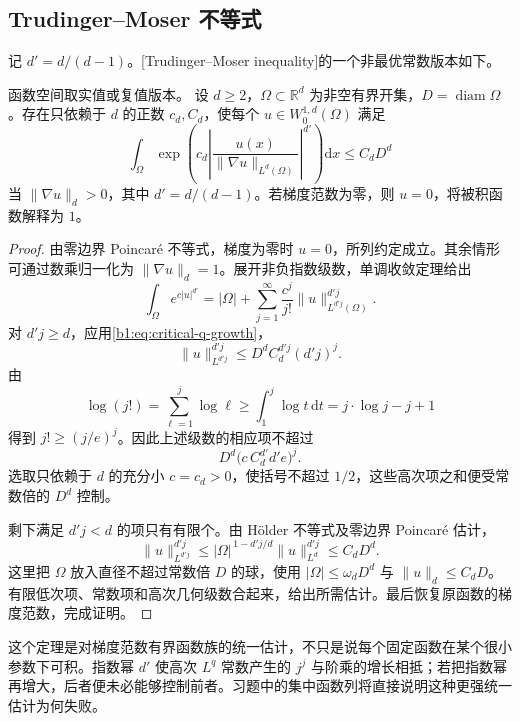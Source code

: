 \subsection{Trudinger–Moser 不等式}
\label{b1:subsec:240502}

记 \(d'=d/(d-1)\)。[Trudinger--Moser inequality]的一个非最优常数版本如下。

\begin{theorem}\label{b1:thm:trudinger-moser}
函数空间取实值或复值版本。
设 \(d\ge2\)，\(\Omega\subset\mathbb R^d\) 为非空有界开集，\(D=\operatorname{diam}\Omega\)。存在只依赖于 \(d\) 的正数 \(c_d,C_d\)，使每个 \(u\in W_0^{1,d}(\Omega)\) 满足
\begin{equation}\label{b1:eq:trudinger-moser}
 \int_\Omega
  \exp\left(c_d
       \left|\frac{u(x)}{\|\nabla u\|_{L^d(\Omega)}}\right|^{d'}\right)
       \mathrm dx
 \le C_dD^d
\end{equation}
当 \(\|\nabla u\|_d>0\)，其中 \(d'=d/(d-1)\)。若梯度范数为零，则 \(u=0\)，将被积函数解释为 \(1\)。
\end{theorem}
\begin{proof}
由零边界 Poincaré 不等式，梯度为零时 \(u=0\)，所列约定成立。其余情形可通过数乘归一化为 \(\|\nabla u\|_d=1\)。展开非负指数级数，单调收敛定理给出
\[
 \int_\Omega e^{c|u|^{d'}}
 =|\Omega|+
   \sum_{j=1}^\infty\frac{c^j}{j!}
          \|u\|_{L^{d'j}(\Omega)}^{d'j}.
\]
对 \(d'j\ge d\)，应用\eqref{b1:eq:critical-q-growth}，
\[
 \|u\|_{L^{d'j}}^{d'j}
 \le D^d C_d^{d'j}(d'j)^j.
\]
由
\[
 \log(j!)=\sum_{\ell=1}^j\log\ell
 \ge\int_1^j\log t\,\mathrm dt
 =j\cdot \log j-j+1
\]
得到 \(j!\ge(j/e)^j\)。因此上述级数的相应项不超过
\[
 D^d\bigl(c\,C_d^{d'}d'e\bigr)^j.
\]
选取只依赖于 \(d\) 的充分小 \(c=c_d>0\)，使括号不超过 \(1/2\)，这些高次项之和便受常数倍的 \(D^d\) 控制。

剩下满足 \(d'j<d\) 的项只有有限个。由 Hölder 不等式及零边界 Poincaré 估计，
\[
 \|u\|_{L^{d'j}}^{d'j}
 \le|\Omega|^{\,1-d'j/d}\|u\|_{L^d}^{d'j}
 \le C_dD^d.
\]
这里把 \(\Omega\) 放入直径不超过常数倍 \(D\) 的球，使用
\(|\Omega|\le\omega_dD^d\) 与 \(\|u\|_d\le C_dD\)。
有限低次项、常数项和高次几何级数合起来，给出所需估计。最后恢复原函数的梯度范数，完成证明。
\end{proof}

这个定理是对梯度范数有界函数族的统一估计，不只是说每个固定函数在某个很小参数下可积。指数幂 \(d'\) 使高次 \(L^q\) 常数产生的 \(j^j\) 与阶乘的增长相抵；若把指数幂再增大，后者便未必能够控制前者。习题中的集中函数列将直接说明这种更强统一估计为何失败。

